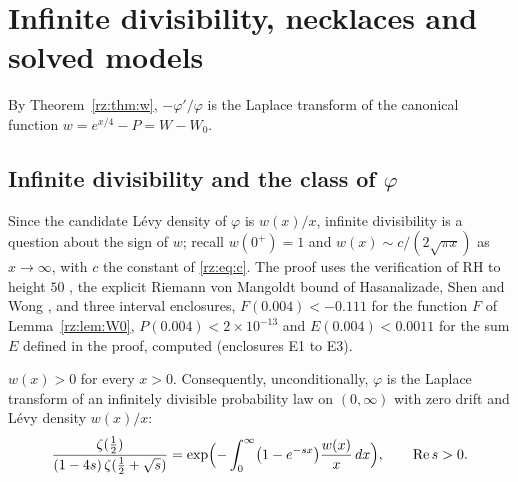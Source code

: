 \section{Infinite divisibility, necklaces and solved models}\label{ch:rz3}

By Theorem~\ref{rz:thm:w}, $-\varphi'/\varphi$ is the Laplace transform of the canonical function $w=e^{x/4}-P=W-W_0$.

\subsection{Infinite divisibility and the class of \texorpdfstring{$\varphi$}{phi}}\label{rz:sec:id}

Since the candidate L\'evy density of $\varphi$ is $w(x)/x$, infinite divisibility is a question about the sign of $w$; recall $w(0^+)=1$ and $w(x)\sim c/(2\sqrt{\pi x})$ as $x\to\infty$, with $c$ the constant of \eqref{rz:eq:c}. The proof uses the verification of RH to height $50$ \cite{Backlund,PT21}, the explicit Riemann von Mangoldt bound of Hasanalizade, Shen and Wong \cite{HSW22}, and three interval enclosures, $F(0.004)<-0.111$ for the function $F$ of Lemma~\ref{rz:lem:W0}, $P(0.004)<2\times10^{-13}$ and $E(0.004)<0.0011$ for the sum $E$ defined in the proof, computed (enclosures E1 to E3).

\begin{theorem}\label{rz:thm:id}
$w(x)>0$ for every $x>0$. Consequently, unconditionally, $\varphi$ is the Laplace transform of an infinitely divisible probability law on $(0,\infty)$ with zero drift and L\'evy density $w(x)/x$:
\[
\frac{\zeta(\frac12)}{(1-4s)\,\zeta(\frac12+\sqrt{s})}=\exp\Bigl(-\int_0^\infty\bigl(1-e^{-sx}\bigr)\frac{w(x)}{x}\,dx\Bigr),\qquad \operatorname{Re} s>0 .
\]
\end{theorem}

